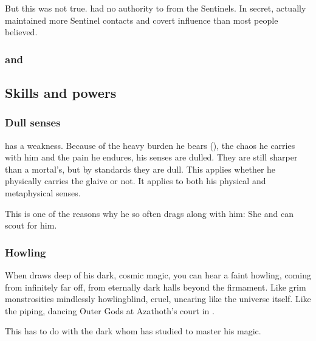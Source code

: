 But this was not true. 
\Secherdamon{} had no authority to  \Ishnaruchaefir{} from the Sentinels. 
In secret, \Ishnaruchaefir{} actually maintained more Sentinel contacts and covert influence than most people believed. 





\subsubsection{\Zaz and \Urzaz}










\subsection{Skills and powers}





\subsubsection{Dull senses}
\Ishnaruchaefir{} has a weakness. 
Because of the heavy burden he bears (\Rystessakhin), the chaos he carries with him and the pain he endures, his senses are dulled. 
They are still sharper than a mortal's, but by \draconic{} standards they are dull. 
This applies whether he physically carries the glaive or not. 
It applies to both his physical and metaphysical senses. 

This is one of the reasons why he so often drags \Criseis{} along with him: 
She  and can scout for him. 





\subsubsection{Howling}
When \Ishnaruchaefir{} draws deep of his dark, cosmic magic, you can hear a faint howling, coming from infinitely far off, from eternally dark halls beyond the firmament. Like grim monstrosities mindlessly howling\dash blind, cruel, uncaring like the universe itself. Like the piping, dancing Outer Gods at Azathoth's court in . 

This has to do with the dark  whom \Ishnaruchaefir{} has studied to master his magic. 





